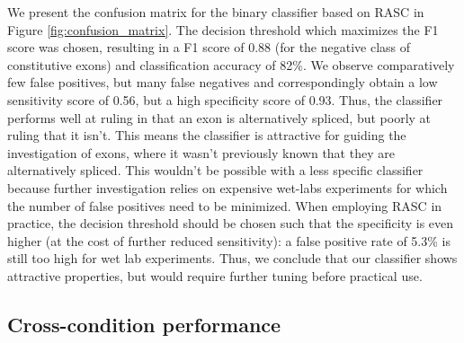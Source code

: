 We present the confusion matrix for the binary classifier based on RASC in Figure \ref{fig:confusion_matrix}. The decision threshold which maximizes the F1 score was chosen, resulting in a F1 score of 0.88 (for the negative class of constitutive exons) and classification accuracy of 82\%. We observe comparatively few false positives, but many false negatives and correspondingly obtain a low sensitivity score of 0.56, but a high specificity score of 0.93. Thus, the classifier performs well at ruling in that an exon is alternatively spliced, but poorly at ruling that it isn't. This means the classifier is attractive for guiding the investigation of exons, where it wasn't previously known that they are alternatively spliced. This wouldn't be possible with a less specific classifier because further investigation relies on expensive wet-labs experiments for which the number of false positives need to be minimized. When employing RASC in practice, the decision threshold should be chosen such that the specificity is even higher (at the cost of further reduced sensitivity): a false positive rate of 5.3\% is still too high for wet lab experiments. Thus, we conclude that our classifier shows attractive properties, but would require further tuning before practical use. 





\subsection{Cross-condition performance} \label{subsec:hipsci_ipsc_majiq}

